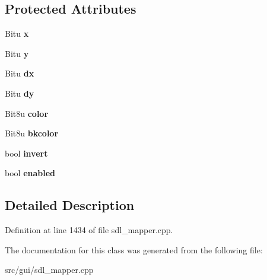 \subsection*{Protected Attributes}
\begin{DoxyCompactItemize}
\item 
\hypertarget{classCButton_a31c9a5bc0e54382407372236ef0fce68}{Bitu {\bfseries x}}\label{classCButton_a31c9a5bc0e54382407372236ef0fce68}

\item 
\hypertarget{classCButton_a6be6467fc0eb283d33caa042c6c2bfbe}{Bitu {\bfseries y}}\label{classCButton_a6be6467fc0eb283d33caa042c6c2bfbe}

\item 
\hypertarget{classCButton_a0d46295304a83ce1a81fc42056ae3959}{Bitu {\bfseries dx}}\label{classCButton_a0d46295304a83ce1a81fc42056ae3959}

\item 
\hypertarget{classCButton_a6bb4df5cec766a3675bf3365927ff45f}{Bitu {\bfseries dy}}\label{classCButton_a6bb4df5cec766a3675bf3365927ff45f}

\item 
\hypertarget{classCButton_acf415cea0b3968f10393d204a0c4f4ec}{Bit8u {\bfseries color}}\label{classCButton_acf415cea0b3968f10393d204a0c4f4ec}

\item 
\hypertarget{classCButton_a34acf521fa23393acf3aa72b627489e6}{Bit8u {\bfseries bkcolor}}\label{classCButton_a34acf521fa23393acf3aa72b627489e6}

\item 
\hypertarget{classCButton_a8b3db5e11eaef4d5b539493abfcf0db9}{bool {\bfseries invert}}\label{classCButton_a8b3db5e11eaef4d5b539493abfcf0db9}

\item 
\hypertarget{classCButton_a4037c6c6e9cce44e38d21c4f87925193}{bool {\bfseries enabled}}\label{classCButton_a4037c6c6e9cce44e38d21c4f87925193}

\end{DoxyCompactItemize}


\subsection{Detailed Description}


Definition at line 1434 of file sdl\-\_\-mapper.\-cpp.



The documentation for this class was generated from the following file\-:\begin{DoxyCompactItemize}
\item 
src/gui/sdl\-\_\-mapper.\-cpp\end{DoxyCompactItemize}
